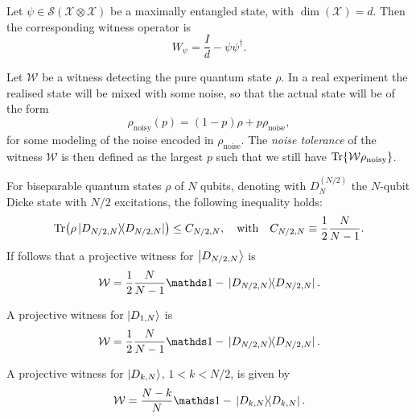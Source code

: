 \documentclass[12pt]{report}
\newcommand{\calS}{{\mathcal{S}}}
\newcommand{\calX}{{\mathcal{X}}}
\begin{document}
\begin{example}
	Let $\psi\in\calS(\calX\otimes\calX)$ be a maximally entangled state, with $\dim(\calX)=d$. Then the corresponding witness operator is
	\begin{equation}
		W_\psi = \frac{I}{d} - \psi\psi^\dagger.
	\end{equation}
\end{example}



\begin{defn}
	Let $\mathcal W$ be a witness detecting the pure quantum state $\rho$.
	In a real experiment the realised state will be mixed with some noise, so that the actual state will be of the form
	\begin{equation}
		\rho_{\text{noisy}}(p) = (1-p) \rho + p \rho_{\text{noise}},
	\end{equation}
	for some modeling of the noise encoded in $\rho_{\text{noise}}$.
	The \emph{noise tolerance} of the witness $\mathcal W$ is then defined as the largest $p$ such that we still have $\Tr{\mathcal W \rho_{\text{noisy}}}$.
\end{defn}


\begin{thm}
	For biseparable quantum states $\rho$ of $N$ qubits,
	denoting with $D_N^{(N/2)}$ the $N$-qubit Dicke state with $N/2$ excitations,
	the following inequality holds:
	\begin{equation}
		\Tr(\rho \ketbra*{D_{N/2,N}}{D_{N/2,N}})
		\le C_{N/2, N},
		\quad\text{with}\quad
		C_{N/2,N} \equiv \frac{1}{2}\frac{N}{N-1}.
	\end{equation}
	If follows that a projective witness for $\ket{D_{N/2,N}}$ is
	\begin{equation}
		\mathcal W = \frac{1}{2} \frac{N}{N - 1} \mathds 1 -
			\ketbra*{D_{N/2,N}}{D_{N/2,N}}.
	\end{equation}
\end{thm}

\begin{thm}
	A projective witness for $\ket{D_{1, N}}$ is
	\begin{equation}
		\mathcal W = \frac{1}{2} \frac{N}{N - 1} \mathds 1 -
			\ketbra*{D_{N/2,N}}{D_{N/2,N}}.
	\end{equation}
\end{thm}

\begin{thm}
	A projective witness for $\ket{D_{k, N}}$, $1 < k < N/2$, is given by
	\begin{equation}
		\mathcal W = \frac{N - k}{N} \mathds 1 - \ketbra*{D_{k,N}}{D_{k,N}}.
	\end{equation}
\end{thm}
\end{document}
